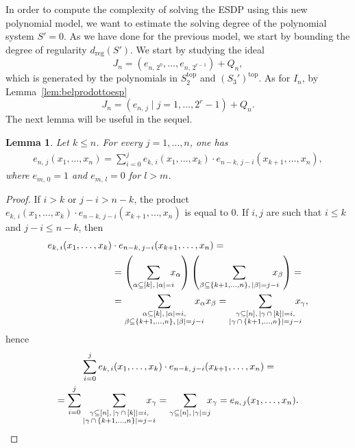 \documentclass[11pt]{article}
\newcommand{\es}[2]{e_{#1,\, #2}}
\theoremstyle{plain}
\newtheorem{lem}[theo]{Lemma}
\theoremstyle{definition}
\theoremstyle{remark}
\begin{document}
In order to compute the complexity of solving the ESDP using this new polynomial model, we want to estimate the solving degree of the polynomial system $S'=0$. As we have done for the previous model, we start by bounding the degree of regularity $d_{\operatorname{reg}}(S')$. 
We start by studying the ideal 
$$J_n=(\es{n}{2^0},\dots,\es{n}{2^{r-1}})+Q_n,$$ 
which is generated by the polynomials in $S_2^{\operatorname{top}}$ and $(S_3')^{\operatorname{top}}$. As for $I_n$, by Lemma~\ref{lem:belprodottoesp}
\begin{equation*}
    J_n=(\es{n}{j}\mid j=1,\dots,2^r-1)+Q_n.
\end{equation*}
The next lemma will be useful in the sequel.
\begin{lem}\label{full prod}
    Let $k\leq n$.
    For every $j=1,\dots,n$, one has
    \begin{align*}
        \es{n}{j}(x_1,\dots,x_n)=\sum_{i=0}^j\es{k}{i}(x_1,\dots,x_k)\cdot\es{n-k}{j-i}(x_{k+1},\dots,x_n),
    \end{align*}
    where $\es{m}{0}=1$ and $\es{m}{l}=0$ for $l>m$.
\end{lem}
\begin{proof}
    If $i>k$ or $j-i>n-k$, the product $\es{k}{i}(x_1,\dots,x_k)\cdot\es{n-k}{j-i}(x_{k+1},\dots,x_n)$ is equal to $0$.
    If $i,j$ are such that $i\leq k$ and $j-i\leq n-k$, then
    \begin{align*}
        \es{k}{i}(x_1,\dots,x_k)&\cdot\es{n-k}{j-i}(x_{k+1},\dots,x_n)=\\
        &=\left(\sum_{\alpha\subseteq[k],\,|\alpha|=i}\hspace{-0.2cm}x_\alpha\right)\left(\sum_{\beta\subseteq\{k+1,\dots,n\},\,|\beta|=j-i}\hspace{-0.3cm}x_\beta\right)=\\
        &=\sum_{\substack{\alpha\subseteq[k],\,|\alpha|=i,\\\beta\subseteq\{k+1,\dots,n\},\,|\beta|=j-i}}\hspace{-0.4cm}x_\alpha x_\beta
        =\sum_{\substack{\gamma\subseteq[n],\,|\gamma\,\cap\,[k]|=i,\\|\gamma\,\cap\,\{k+1,\dots,n\}|=j-i}}\hspace{-0.3cm}x_\gamma,
    \end{align*}
hence
    \begin{align*}
        &\sum_{i=0}^j\es{k}{i}(x_1,\dots,x_k)\cdot\es{n-k}{j-i}(x_{k+1},\dots,x_n)=\\
        =\sum_{i=0}^j&\sum_{\substack{\gamma\subseteq[n],\,|\gamma\,\cap\,[k]|=i,\\|\gamma\,\cap\,\{k+1,\dots,n\}|=j-i}}\hspace{-0.4cm}x_\gamma
        =\sum_{\gamma\subseteq[n],\,|\gamma|=j}\hspace{-0.2cm}x_\gamma
        =\es{n}{j}(x_1,\dots,x_n).
    \end{align*}
\end{proof}
\end{document}
